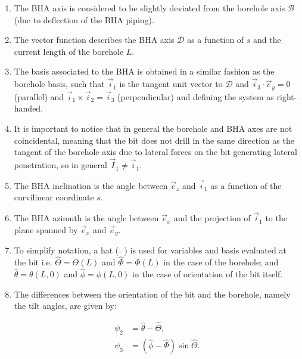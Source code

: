 \begin{enumerate}
	\item The \acs{BHA} axis  is considered to be slightly deviated from the borehole axis $\mathcal{B}$ (due to deflection of the BHA piping).
	
	\item The vector function  describes the \acs{BHA} axis $\mathcal{D}$ as a function of $s$ and the current length of the borehole $L$. 
	
	\item The basis associated to the BHA  is obtained in a similar fashion as the borehole basis, such that $\vec{i}_1$ is the tangent unit vector to $\mathcal{D}$ and  $\vec{i}_3 \cdot \vec{e}_y = 0$ (parallel) and $\vec{i}_1 \times \vec{i}_2 = \vec{i}_3$ (perpendicular) and defining the system as right-handed.
	
	\item It is important to notice that in general the borehole and BHA axes are not coincidental, meaning that the bit does not drill in the same direction as the tangent of the borehole axis due to lateral forces on the bit generating lateral penetration, so in general $\vec{I}_1 \ne \vec{i}_1$.
	
	\item The \acs{BHA} inclination  is the angle between $\vec{e}_z$ and $\vec{i}_1$ as a function of the curvilinear coordinate $s$.
	
	\item The \acs{BHA} azimuth  is the angle between $\vec{e}_x$ and the projection of $\vec{i}_1$ to the plane spanned by $\vec{e}_x$ and $\vec{e}_y$.
	
	\item To simplify notation, a hat ( $\hat{ }$ ) is used for variables and basis evaluated at the bit i.e. $\hat{\Theta} = \Theta(L)$ and $\hat{\Phi} = \Phi(L)$ in the case of the borehole; and $\hat{\theta} = \theta(L,0)$ and $\hat{\phi} = \phi(L,0)$ in the case of orientation of the bit itself.
	
	\item The differences between the orientation of the bit and the borehole, namely the tilt angles, are given by:
	
	\begin{align}
		\psi_2 &= \hat{\theta} - \hat{\Theta}, \nonumber\\
		\psi_3 &= (\hat{\phi} - \hat{\Phi})\sin{\hat{\Theta}}.
	\end{align}

\end{enumerate}

